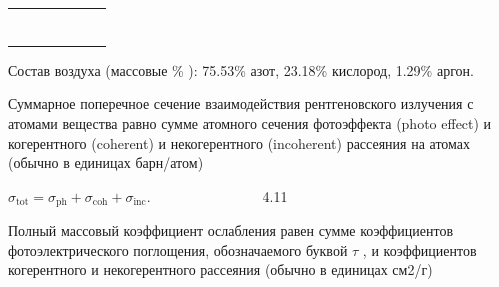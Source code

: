\documentclass[a4paper,14pt, openany, twoside, draft]{extbook} %
\begin{document}
\begin{flushleft}
\begin{supertabular}{m{2.299cm}|m{2.162cm}|m{2.292cm}|m{2.2059999cm}|m{1.7459999cm}|m{1.134cm}|m{2.391cm}|}
 &
\centering{}\\\hhline{~------}
 &
 &
 &
 &
 &
 &
\centering{}\\\hline
{} &
 &
 &
 &
 &
 &
\\\hline
{} &
 &
 &
 &
 &
 &
\centering{}\\\hline
 &
 &
 &
 &
 &
 &
\centering{}\\\hhline{~------}
 &
 &
 &
 &
 &
 &
\centering{}\\\hhline{~------}
\end{supertabular}
\end{flushleft}
Состав воздуха (массовые  \% ): 75.53\% азот, 23.18\% кислород, 1.29\% аргон.

Суммарное поперечное сечение взаимодействия рентгеновского излучения с атомами вещества равно сумме атомного сечения фотоэффекта (photo effect) и когерентного (coherent) и некогерентного (incoherent) рассеяния на атомах (обычно в единицах барн/атом)

 $\sigma _{\text{tot}}=\sigma _{\text{ph}}+\sigma _{\text{coh}}+\sigma _{\text{inc}}$.\ \ \ \ \ \ \ \ \ \ \ \ \ \ \ \ 4.11

Полный массовый коэффициент ослабления равен сумме коэффициентов фотоэлектрического поглощения, обозначаемого буквой ${\tau}$ , и коэффициентов когерентного и некогерентного рассеяния (обычно в единицах см2/г)
\end{document}
